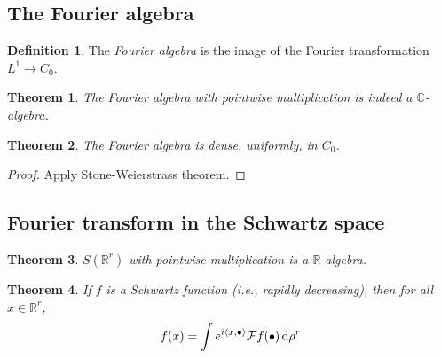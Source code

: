 \documentclass[11pt, a4paper, openany]{book}
\newtheorem{thm}{Theorem}\newtheorem{lem}{Lemma}\newtheorem{crl}{Corollary}
\theoremstyle{definition}
\newtheorem{define}{Definition}\newtheorem{exam}{Example}\newtheorem{remark}{Remark}
\begin{document}
\subsection{The Fourier algebra}
    \begin{define}
        The \textit{Fourier algebra} is the image of the Fourier transformation $L^1\rightarrow C_0$.
    \end{define}
    \begin{thm}
        The Fourier algebra with pointwise multiplication is indeed a $\mathbb{C}$-algebra.
    \end{thm}
    \begin{thm}\label{density of Fourier algebra in C_0}
        The Fourier algebra is dense, uniformly, in $C_0$.
    \end{thm}
    \begin{proof}
        Apply Stone-Weierstrass theorem.
    \end{proof}
\subsection{Fourier transform in the Schwartz space}
    \begin{thm}
        $S(\mathbb{R}^r)$ with pointwise multiplication is a $\mathbb{R}$-algebra.
    \end{thm}
    \begin{thm}
        If $f$ is a Schwartz function (i.e., rapidly decreasing), then for all $x\in \mathbb{R}^r$,
        \[
            f(x)=\int e^{i\langle x,\bullet\rangle}\mathcal{F}f(\bullet)\odif\rho^r
        \]
    \end{thm}
\end{document}
